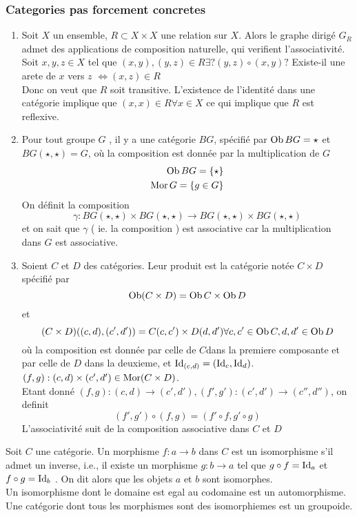 \documentclass[../main.tex]{subfiles}
\begin{document}
\subsubsection{Categories pas forcement concretes}
\begin{enumerate}
\item Soit $X $ un ensemble, $R \subset X \times X$ une relation sur $X$. Alors le graphe dirigé $G_R$ admet des applications de composition naturelle, qui verifient l'associativité.\\
	Soit $x,y,z \in X $ tel que $( x,y) , ( y,z)  \in R \exists ? ( y,z ) \circ ( x,y) ?$ 
	Existe-il une arete de $x$ vers $z$ $\iff ( x,z) \in R$ \\
	Donc on veut que $R$ soit transitive.
	L'existence de l'identité dans une catégorie implique que $( x,x) \in R \forall x \in X$ ce qui implique que $R$ est reflexive.
\item Pour tout groupe $G$ , il y a une catégorie $BG$, spécifié par $\operatorname{Ob} BG = \star$ et $BG( \star,\star) =G$, où la composition est donnée par la multiplication de $G$ 
	\begin{align*}
	\operatorname{Ob} BG = \left\{ \star \right\} \\
	\operatorname{Mor} G   = \left\{  g\in G \right\} 
	\end{align*}
	On définit la composition
	\[ 
		\gamma: BG ( \star, \star) \times BG ( \star, \star) \to BG( \star,\star) \times BG( \star,\star)
	\]
	et on sait que $\gamma$ ( ie. la composition ) est associative car la multiplication dans $G$ est associative.
\item Soient $C$ et $D$ des catégories. Leur produit est la catégorie notée $C\times D$ spécifié par
	\[ 
		\operatorname{Ob} ( C\times D) = \operatorname{Ob} C\times \operatorname{Ob} D
	\]
	et
	\[ 
		( C\times D) ( ( c,d) , ( c',d') ) = C( c,c') \times D( d,d') \forall c, c' \in \operatorname{Ob} C, d,d' \in \operatorname{Ob} D
	\]
	où la composition est donnée par celle de $C$dans la premiere composante et par celle de $D$ dans la deuxieme, et $\operatorname{Id}_{(c,d) } = ( \operatorname{Id}_c, \operatorname{Id}_d) $.\\
	$( f,g) : ( c,d) \times ( c',d') \in\operatorname{Mor} ( C\times D) $.\\
	Etant donné $( f,g) :( c,d) \to ( c',d'), ( f',g') : ( c',d') \to ( c'', d'' ) $, on definit 
	\[ 
		( f',g') \circ ( f,g) = ( f'\circ f, g' \circ g) 
	\]
	L'associativité suit de la composition associative dans $C$ et $D$ 
 	
\end{enumerate}
\begin{defn}[Isomorphisme]
	Soit $C$ une catégorie. Un morphisme $f: a\to b$ dans $C$ est un isomorphisme s'il admet un inverse, i.e., il existe un morphisme $g: b\to a$ tel que $g\circ f = \operatorname{Id}_a	$ et $f\circ g= \operatorname{Id}_b$ . On dit alors que les objets $a$ et $b$ sont isomorphes.\\
	Un isomorphisme dont le domaine est egal au codomaine est un automorphisme. Une catégorie dont tous les morphismes sont des isomorphiemes est un groupoide.
\end{defn}
\end{document}
